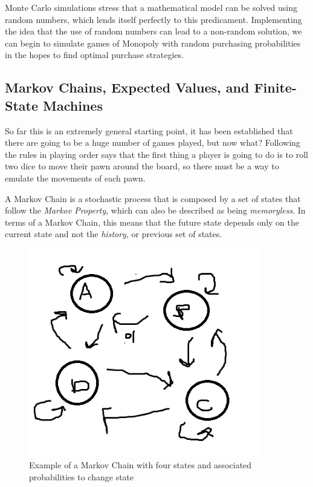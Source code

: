 \documentclass{article}
\begin{document}
Monte Carlo simulations stress that a mathematical model can be solved using random numbers, which lends itself perfectly to this predicament.  Implementing the idea that the use of random numbers can lead to a non-random solution, we can begin to simulate games of Monopoly with random purchasing probabilities in the hopes to find optimal purchase strategies.

\subsection{Markov Chains, Expected Values, and Finite-State Machines}

So far this is an extremely general starting point, it has been established that there are going to be a huge number of games played, but now what?  Following the rules in playing order says that the first thing a player is going to do is to roll two dice to move their pawn around the board, so there must be a way to emulate the movements of each pawn.

A Markov Chain is a stochastic process that is composed by a set of states that follow the \textit{Markov Property}, which can also be described as being \textit{memoryless}.  In terms of a Markov Chain, this means that the future state depends only on the current state and not the \textit{history}, or previous set of states.

\begin{figure}
    \centering
    \includegraphics[width=4.0in]{betamarkovchain}
    \caption{Example of a Markov Chain with four states and associated probabilities to change state}
    \label{example_markov_chain}
\end{figure}
\end{document}
